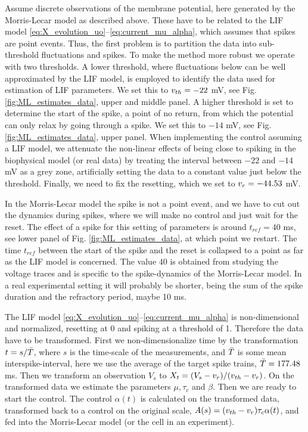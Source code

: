 Assume discrete observations of the membrane potential, here generated
by the Morris-Lecar model as described above. These have to be related to the LIF model
\eqref{eq:X_evolution_uo}--\eqref{eq:current_mu_alpha}, which 
assumes that spikes are point events. Thus, the first problem is to
partition the data into sub-threshold fluctuations and spikes. To make
the method more robust we operate with two thresholds. A lower
threshold, where fluctuations below can be well approximated by the
LIF model, is employed to identify the data used for estimation of LIF
parameters. We set this to $v_{th} = -22$ mV, see
Fig. \ref{fig:ML_estimates_data}, upper and middle panel. A higher threshold is set to
determine the start of the spike, a point of no return, from which the potential can only
relax by going through a spike. We set this to $-14$ mV, see
Fig. \ref{fig:ML_estimates_data}, upper panel. When implementing the control
assuming a LIF model, we attenuate the non-linear effects of being
close to spiking in the biophysical model (or real data) by treating the interval between $-22$ and $-14$ mV
as a grey zone, artificially setting the data to a constant value just
below the threshold. Finally, we need to fix the resetting, which we
set to $v_r = -44.53$ mV.

In the Morris-Lecar model the spike is not a point event, and we have
to cut out the dynamics during spikes, where we will make no control
and just wait for the reset. The effect of a spike for this setting of
parameters is around $t_{ref} = 40$ ms, see lower panel of
Fig. \ref{fig:ML_estimates_data}, at
which point we restart. The time $t_{ref}$ between the start of the spike and
the reset is collapsed to
a point as far as the LIF model is concerned. The value $40$ is obtained from studying
the voltage traces and is specific to the spike-dynamics of the Morris-Lecar
model. In a real experimental setting it will probably be shorter,
being the sum of the spike duration and the refractory period, 
maybe 10 ms.

The LIF model \eqref{eq:X_evolution_uo}--\eqref{eq:current_mu_alpha}  is
non-dimensional and normalized, resetting at 0 and spiking at a threshold of 1.
Therefore the data have to be transformed. First we non-dimensionalize time by
the transformation $t=s/\bar T$, where $s$ is the time-scale of the
measurements, and $\bar T$ is some mean interspike-interval, here we use the
average of the target spike trains, $\bar T=177.48$ ms. Then we transform an
observation $V_s$ to $X_t =(V_s - v_r)/(v_{th} - v_r)$. On the transformed
data we estimate the parameters $\mu, \tau_c$ and $\beta$. Then we are ready to
start the control. The control $\alpha (t)$ is calculated on the transformed
data, transformed back to a control on the original scale, $A(s)=(v_{th} -
v_r)\tau_c \alpha (t)$, and fed into the Morris-Lecar model (or the cell in
an experiment).

